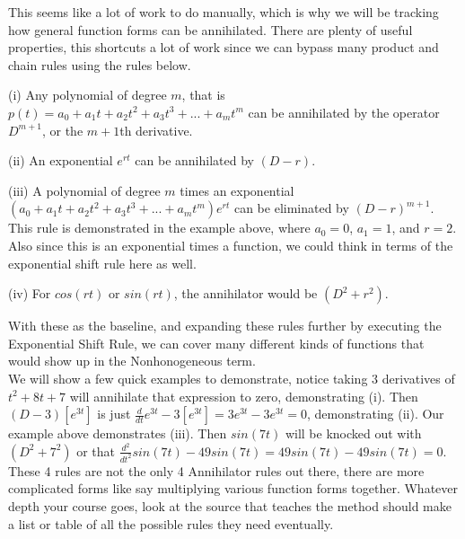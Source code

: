\documentclass[12pt]{article}
\begin{document}
This seems like a lot of work to do manually, which is why we will be tracking how general function forms can be annihilated. There are plenty of useful properties, this shortcuts a lot of work since we can bypass many product and chain rules using the rules below.

\vspace{10pt}

(i) Any polynomial of degree $m$, that is $p(t)=a_0+a_1t+a_2t^2+a_3t^3+...+a_mt^m$ can be annihilated by the operator $D^{m+1}$, or the $m+1$th derivative.

\vspace{10pt}

(ii) An exponential $e^{rt}$ can be annihilated by $(D-r)$.

\vspace{10pt}

(iii) A polynomial of degree $m$ times an exponential $(a_0+a_1t+a_2t^2+a_3t^3+...+a_mt^m)e^{rt}$ can be eliminated by $(D-r)^{m+1}$. This rule is demonstrated in the example above, where $a_0=0$, $a_1=1$, and $r=2$. Also since this is an exponential times a function, we could think in terms of the exponential shift rule here as well.

\vspace{10pt}

(iv) For $cos(r t)$ or $sin(r t)$, the annihilator would be $(D^2+r^2)$.

\vspace{10pt}

With these as the baseline, and expanding these rules further by executing the Exponential Shift Rule, we can cover many different kinds of functions that would show up in the Nonhonogeneous term. \\

We will show a few quick examples to demonstrate, notice taking $3$ derivatives of $t^2+8t+7$ will annihilate that expression to zero, demonstrating (i). Then $(D-3)[e^{3t}]$ is just $\frac{d}{dt}e^{3t}-3[e^{3t}]=3e^{3t}-3e^{3t}=0$, demonstrating (ii). Our example above demonstrates (iii). Then $sin(7t)$ will be knocked out with $(D^2+7^2)$ or that $\frac{d^2}{dt^2}sin(7t)-49sin(7t)=49sin(7t)-49sin(7t)=0$. \\

These 4 rules are not the only 4 Annihilator rules out there, there are more complicated forms like say multiplying various function forms together. Whatever depth your course goes, look at the source that teaches the method should make a list or table of all the possible rules they need eventually.
\end{document}
